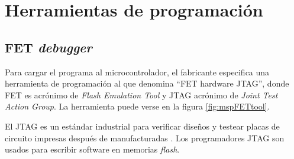 \section{Herramientas de programación}
\label{sec:cap2parte2}
\subsection{FET \textit{debugger}}


Para cargar el programa al microcontrolador, el fabricante especifica una herramienta de programación al que denomina \textquotedblleft FET hardware JTAG\textquotedblright , donde FET es acrónimo de \textit{Flash Emulation Tool} y JTAG acrónimo de \textit{Joint Test Action Group}. La herramienta puede verse en la figura \ref{fig:mspFETtool}.

El JTAG es un estándar industrial para verificar diseños y testear placas de circuito impresas después de manufacturadas \cite{JTAGintel}. Los programadores JTAG son usados para escribir software en memorias \textit{flash}.


